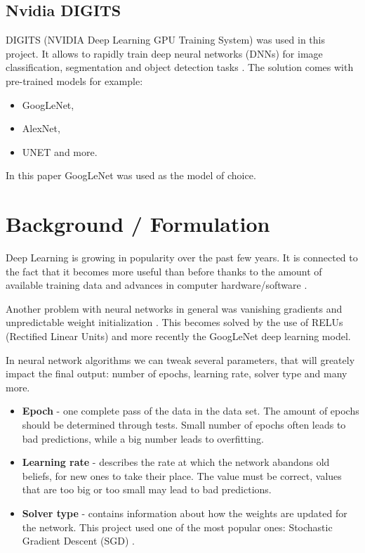 \documentclass[10pt,journal,compsoc]{IEEEtran}
\begin{document}
    \subsection{Nvidia DIGITS}
    DIGITS (NVIDIA Deep Learning GPU Training System) was used in this project. It allows to rapidly train deep neural networks (DNNs) for image classification, segmentation and object detection tasks \cite{digitswww,tools}. \newline\newline
    The solution comes with pre-trained models for example:

    \begin{itemize}
        \item GoogLeNet,
        \item AlexNet,
        \item UNET and more.        
    \end{itemize}
    \noindent
    In this paper GoogLeNet was used as the model of choice.
    
    \section{Background / Formulation}
    Deep Learning is growing in popularity over the past few years. It is connected to the fact that it becomes more useful than before thanks to the amount of available training data and advances in computer hardware/software \cite{dl}. 

    Another problem with neural networks in general was vanishing gradients and unpredictable weight initialization \cite{glnp}. This becomes solved by the use of RELUs (Rectified Linear Units)\cite{relu} and more recently the GoogLeNet deep learning model\cite{dwc}.

    In neural network algorithms we can tweak several parameters, that will greately impact the final output: number of epochs, learning rate, solver type and many more.

    \begin{itemize}
        \item \textbf{Epoch} - one complete pass  of the data in the data set. The amount of epochs should be determined through tests. Small number of epochs often leads to bad predictions, while a big number leads to overfitting.
        \item \textbf{Learning rate} - describes the rate at which the network abandons old beliefs, for new ones to take their place. The value must be correct, values that are too big or too small may lead to bad predictions.
        \item \textbf{Solver type} - contains information about how the weights are updated for the network. This project used one of the most popular ones: Stochastic Gradient Descent (SGD) \cite{sgd}. 
    \end{itemize}
\end{document}
